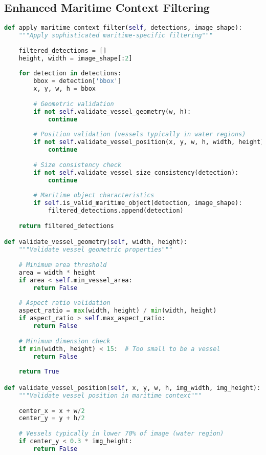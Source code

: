 \documentclass[12pt,a4paper]{report}
\begin{document}
\subsection{Enhanced Maritime Context Filtering}
\begin{lstlisting}[language=Python, caption=Advanced Maritime Context Filter]
def apply_maritime_context_filter(self, detections, image_shape):
    """Apply sophisticated maritime-specific filtering"""
    
    filtered_detections = []
    height, width = image_shape[:2]
    
    for detection in detections:
        bbox = detection['bbox']
        x, y, w, h = bbox
        
        # Geometric validation
        if not self.validate_vessel_geometry(w, h):
            continue
            
        # Position validation (vessels typically in water regions)
        if not self.validate_vessel_position(x, y, w, h, width, height):
            continue
            
        # Size consistency check
        if not self.validate_vessel_size_consistency(detection):
            continue
            
        # Maritime object characteristics
        if self.is_valid_maritime_object(detection, image_shape):
            filtered_detections.append(detection)
    
    return filtered_detections

def validate_vessel_geometry(self, width, height):
    """Validate vessel geometric properties"""
    
    # Minimum area threshold
    area = width * height
    if area < self.min_vessel_area:
        return False
    
    # Aspect ratio validation
    aspect_ratio = max(width, height) / min(width, height)
    if aspect_ratio > self.max_aspect_ratio:
        return False
    
    # Minimum dimension check
    if min(width, height) < 15:  # Too small to be a vessel
        return False
        
    return True

def validate_vessel_position(self, x, y, w, h, img_width, img_height):
    """Validate vessel position in maritime context"""
    
    center_x = x + w/2
    center_y = y + h/2
    
    # Vessels typically in lower 70% of image (water region)
    if center_y < 0.3 * img_height:
        return False
    

\end{lstlisting}
\end{document}
